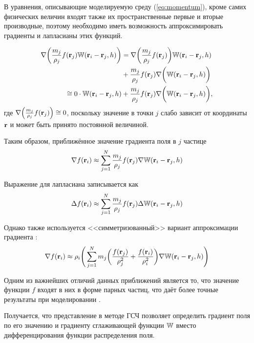 В уравнения, описывающие моделируемую среду (\ref{eq:momentum}), кроме самих физических величин входят также их пространственные первые и вторые производные, поэтому необходимо иметь возможность аппроксимировать градиенты и лапласианы этих функций.

\begin{align*}
  \nabla\bigg(\frac{m_j}{\rho_j}f(\boldsymbol{\mathbf{r}}_j)\mathbb W(\boldsymbol{\mathbf{r}}_i-\boldsymbol{\mathbf{r}}_j, h)\bigg)&=\nabla\bigg(\frac{m_j}{\rho_j}f(\boldsymbol{\mathbf{r}}_j)\bigg)\mathbb W(\boldsymbol{\mathbf{r}}_i-\boldsymbol{\mathbf{r}}_j, h)\\
  &+\frac{m_j}{\rho_j}f(\boldsymbol{\mathbf{r}}_j)\nabla\bigg(\mathbb W(\boldsymbol{\mathbf{r}}_i-\boldsymbol{\mathbf{r}}_j, h)\bigg)\\
  \cong 0\cdot \mathbb W(\boldsymbol{\mathbf{r}}_i-\boldsymbol{\mathbf{r}}_j, h)&+\frac{m_j}{\rho_j}f(\boldsymbol{\mathbf{r}}_j)\nabla\bigg(\mathbb W(\boldsymbol{\mathbf{r}}_i-\boldsymbol{\mathbf{r}}_j, h)\bigg),
\end{align*}
где $\nabla\Big(\frac{m_j}{\rho_j}f(\boldsymbol{\mathbf{r}}_j)\Big)\cong 0$, поскольку значение в точки $j$ слабо зависит от координаты $\boldsymbol{\mathbf{r}}$ и может быть принято постоянной величиной.

Таким образом, приближённое значение градиента поля в $j$ частице
\begin{equation} \label{eq:approx-nabla-f}
  \nabla f(\boldsymbol{\mathbf{r}}_i)\approx\sum_{j=1}^N\frac{m_j}{\rho_j}f(\boldsymbol{\mathbf{r}}_j)\nabla\mathbb W(\boldsymbol{\mathbf{r}}_i-\boldsymbol{\mathbf{r}}_j, h)
\end{equation}

Выражение для лапласиана записывается как
\begin{equation} \label{eq:approx-laplace-f}
  \Delta f(\boldsymbol{\mathbf{r}}_i)\approx\sum_{j=1}^N\frac{m_j}{\rho_j}f(\boldsymbol{\mathbf{r}}_j)\Delta\mathbb W(\boldsymbol{\mathbf{r}}_i-\boldsymbol{\mathbf{r}}_j, h)
\end{equation}

Однако также используется <<симметризованный>> вариант аппроксимации градиента \cite{monaghan}:
\begin{equation} \label{eq:approx-sym-nabla-f}
  \nabla f(\boldsymbol{\mathbf{r}}_i)\approx\rho_i\Bigg(\sum_{j=1}^N m_j\bigg(\frac{f(\boldsymbol{\mathbf{r}}_j)}{\rho_j^2}+\frac{f(\boldsymbol{\mathbf{r}}_i)}{\rho_i^2}\bigg)\nabla\mathbb W(\boldsymbol{\mathbf{r}}_i-\boldsymbol{\mathbf{r}}_j, h)\Bigg)
\end{equation}

Одним из важнейших отличий данных приближений является то, что значение функции $f$ входят в них в форме парных частиц, что даёт более точные результаты при моделировании \cite{monaghan}.

Получается, что представление в методе ГСЧ позволяет определить градиент поля по его значению и градиенту сглаживающей функции $\mathbb W$ вместо дифференцирования функции распределения поля.


